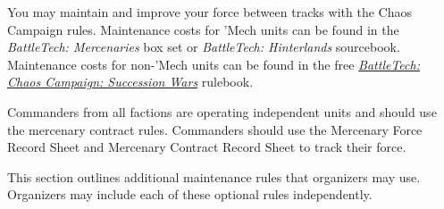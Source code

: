 You may maintain and improve your force between tracks with the Chaos Campaign rules.
Maintenance costs for 'Mech units can be found in the \emph{BattleTech: Mercenaries} box set or \emph{BattleTech: Hinterlands} sourcebook.
Maintenance costs for non-'Mech units can be found in the free \emph{\href{https://store.catalystgamelabs.com/products/battletech-chaos-campaign-succession-wars}{BattleTech: Chaos Campaign: Succession Wars}} rulebook.

Commanders from all factions are operating independent units and should use the mercenary contract rules.
Commanders should use the Mercenary Force Record Sheet and Mercenary Contract Record Sheet to track their force.

This section outlines additional maintenance rules that organizers may use.
Organizers may include each of these optional rules independently.
